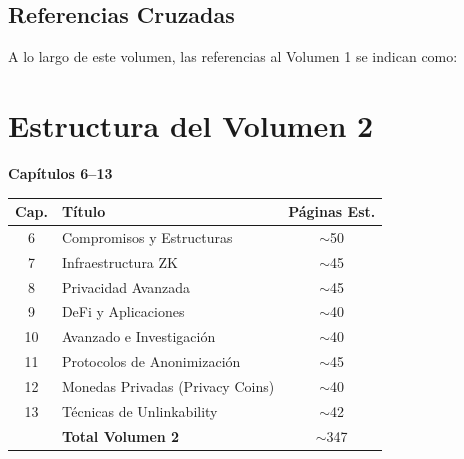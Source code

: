 \documentclass[11pt,a4paper,twoside]{book}
\begin{document}
\section*{Referencias Cruzadas}

A lo largo de este volumen, las referencias al Volumen 1 se indican como:
\begin{center}
\end{center}

\cleardoublepage

\tableofcontents
\cleardoublepage

\chapter*{Estructura del Volumen 2}

\begin{center}
{\Large\bfseries Cap\'itulos 6--13}\\[1cm]

\begin{tabular}{clc}
\toprule
\textbf{Cap.} & \textbf{T\'itulo} & \textbf{P\'aginas Est.} \\
\midrule
6 & Compromisos y Estructuras & $\sim$50 \\
7 & Infraestructura ZK & $\sim$45 \\
8 & Privacidad Avanzada & $\sim$45 \\
9 & DeFi y Aplicaciones & $\sim$40 \\
10 & Avanzado e Investigaci\'on & $\sim$40 \\
11 & Protocolos de Anonimizaci\'on & $\sim$45 \\
12 & Monedas Privadas (Privacy Coins) & $\sim$40 \\
13 & T\'ecnicas de Unlinkability & $\sim$42 \\
\midrule
& \textbf{Total Volumen 2} & $\sim$347 \\
\bottomrule
\end{tabular}
\end{center}

\vspace{1cm}
\end{document}
